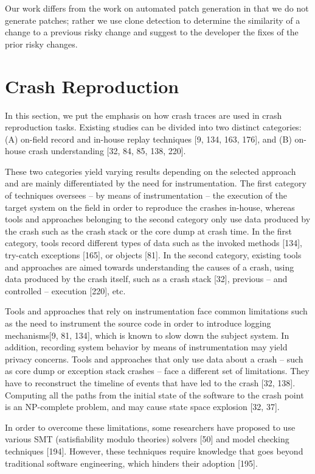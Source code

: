 \documentclass[12pt]{report}
\begin{document}
Our work differs from the work on automated patch generation in that we
do not generate patches; rather we use clone detection to determine the
similarity of a change to a previous risky change and suggest to the
developer the fixes of the prior risky changes.

\section{Crash Reproduction}\label{crash-reproduction}

In this section, we put the emphasis on how crash traces are used in
crash reproduction tasks. Existing studies can be divided into two
distinct categories: (A) on-field record and in-house replay techniques
{[}9, 134, 163, 176{]}, and (B) on-house crash understanding {[}32, 84,
85, 138, 220{]}.

These two categories yield varying results depending on the selected
approach and are mainly differentiated by the need for instrumentation.
The first category of techniques oversees -- by means of instrumentation
-- the execution of the target system on the field in order to reproduce
the crashes in-house, whereas tools and approaches belonging to the
second category only use data produced by the crash such as the crash
stack or the core dump at crash time. In the first category, tools
record different types of data such as the invoked methods {[}134{]},
try-catch exceptions {[}165{]}, or objects {[}81{]}. In the second
category, existing tools and approaches are aimed towards understanding
the causes of a crash, using data produced by the crash itself, such as
a crash stack {[}32{]}, previous -- and controlled -- execution
{[}220{]}, etc.

Tools and approaches that rely on instrumentation face common
limitations such as the need to instrument the source code in order to
introduce logging mechanisms{[}9, 81, 134{]}, which is known to slow
down the subject system. In addition, recording system behavior by means
of instrumentation may yield privacy concerns. Tools and approaches that
only use data about a crash -- such as core dump or exception stack
crashes -- face a different set of limitations. They have to reconstruct
the timeline of events that have led to the crash {[}32, 138{]}.
Computing all the paths from the initial state of the software to the
crash point is an NP-complete problem, and may cause state space
explosion {[}32, 37{]}.

In order to overcome these limitations, some researchers have proposed
to use various SMT (satisfiability modulo theories) solvers {[}50{]} and
model checking techniques {[}194{]}. However, these techniques require
knowledge that goes beyond traditional software engineering, which
hinders their adoption {[}195{]}.
\end{document}
